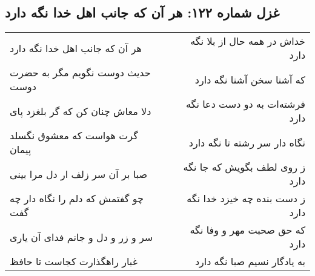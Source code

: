 \begin{center}
\section*{غزل شماره ۱۲۲: هر آن که جانب اهل خدا نگه دارد}
\label{sec:sh122}
\begin{longtable}{l p{0.5cm} r}
هر آن که جانب اهل خدا نگه دارد
&&
خداش در همه حال از بلا نگه دارد
\\
حدیث دوست نگویم مگر به حضرت دوست
&&
که آشنا سخن آشنا نگه دارد
\\
دلا معاش چنان کن که گر بلغزد پای
&&
فرشته‌ات به دو دست دعا نگه دارد
\\
گرت هواست که معشوق نگسلد پیمان
&&
نگاه دار سر رشته تا نگه دارد
\\
صبا بر آن سر زلف ار دل مرا بینی
&&
ز روی لطف بگویش که جا نگه دارد
\\
چو گفتمش که دلم را نگاه دار چه گفت
&&
ز دست بنده چه خیزد خدا نگه دارد
\\
سر و زر و دل و جانم فدای آن یاری
&&
که حق صحبت مهر و وفا نگه دارد
\\
غبار راهگذارت کجاست تا حافظ
&&
به یادگار نسیم صبا نگه دارد
\\
\end{longtable}
\end{center}
